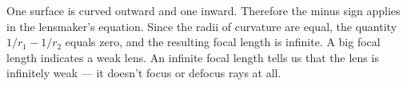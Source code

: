 One surface is curved outward and one inward. Therefore the minus sign
applies in the lensmaker's equation. Since the radii of curvature are
equal, the quantity $1/r_1-1/r_2$ equals zero, and the resulting focal
length is infinite. A big focal length indicates a weak lens. An infinite
focal length tells us that the lens is infinitely weak --- it doesn't
focus or defocus rays at all.
	


